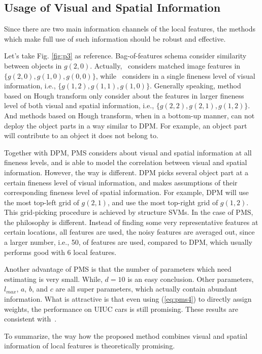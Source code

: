 \documentclass[paper]{ieice}
\begin{document}
\subsection{Usage of Visual and Spatial Information}
Since there are two main information channels of the local features, the methods which make full use of such information should be robust and effective.

Let's take Fig. \ref{fig:p3} as reference. Bag-of-features schema consider similarity between objects in $g(2,0)$. Actually,~\cite{pmk} considers matched image features in $\{g(2,0),g(1,0),g(0,0)\}$, while~\cite{spmk} considers in a single fineness level of visual information, i.e., $\{g(1,2),g(1,1),g(1,0)\}$. Generally speaking, method based on Hough transform only consider about the features in larger fineness level of both visual and spatial information, i.e., $\{g(2,2),g(2,1),g(1,2)\}$. And methods based on Hough transform, when in a bottom-up manner, can not deploy the object parts in a way similar to DPM. For example, an object part will contribute to an object it does not belong to.

Together with DPM, PMS considers about visual and spatial information at all fineness levels, and is able to model the correlation between visual and spatial information. However, the way is different. DPM picks several object part at a certain fineness level of visual information, and makes assumptions of their corresponding fineness level of spatial information. For example, DPM will use the most top-left grid of $g(2,1)$, and use the most top-right grid of $g(1,2)$. This grid-picking procedure is achieved by structure SVMs. In the case of PMS, the philosophy is different. Instead of finding some very representative features at certain locations, all features are used, the noisy features are averaged out, since a larger number, i.e., 50, of features are used, compared to DPM, which usually performs good with 6 local features.

Another advantage of PMS is that the number of parameters which need estimating is very small. While, $d=10$ is an easy conclusion. Other parameters, $l_{max}$, $a$, $b$, and $c$ are all super parameters, which actually contain abundant information. What is attractive is that even using (\ref{eq:pms4}) to directly assign weights, the performance on UIUC cars is still promising. These results are consistent with~\cite{pmk}.

To summarize, the way how the proposed method combines visual and spatial information of local features is theoretically promising.
\end{document}
